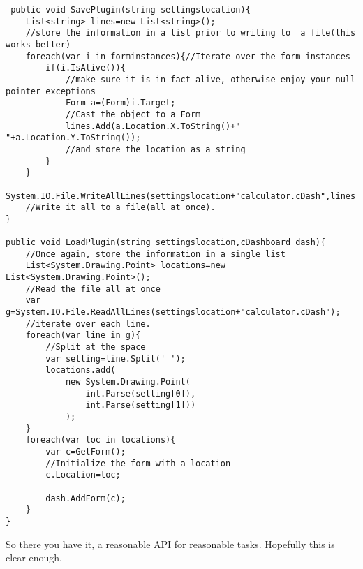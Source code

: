 \documentclass{article}
\begin{document}
 \begin{lstlisting}
 public void SavePlugin(string settingslocation){
	List<string> lines=new List<string>();
 	//store the information in a list prior to writing to  a file(this works better)
	foreach(var i in forminstances){//Iterate over the form instances
		if(i.IsAlive()){
			//make sure it is in fact alive, otherwise enjoy your null pointer exceptions
			Form a=(Form)i.Target;
			//Cast the object to a Form
			lines.Add(a.Location.X.ToString()+" "+a.Location.Y.ToString());
			//and store the location as a string
		}
	}
	System.IO.File.WriteAllLines(settingslocation+"calculator.cDash",lines.ToArray());
	//Write it all to a file(all at once).
}

public void LoadPlugin(string settingslocation,cDashboard dash){
	//Once again, store the information in a single list
	List<System.Drawing.Point> locations=new List<System.Drawing.Point>();
	//Read the file all at once
	var g=System.IO.File.ReadAllLines(settingslocation+"calculator.cDash");
	//iterate over each line.
	foreach(var line in g){
		//Split at the space
		var setting=line.Split(' ');
		locations.add(
			new System.Drawing.Point(
				int.Parse(setting[0]),
				int.Parse(setting[1]))
			);
	}
	foreach(var loc in locations){
		var c=GetForm();
		//Initialize the form with a location
		c.Location=loc;
		
		dash.AddForm(c);
	}
}
 \end{lstlisting}

So there you have it, a reasonable API for reasonable tasks. Hopefully this is clear enough.
\end{document}
